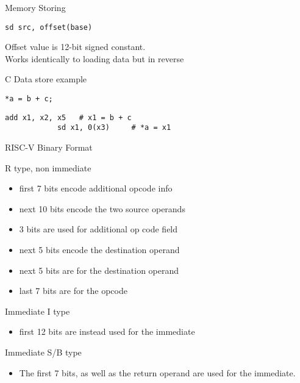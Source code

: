 \documentclass{report}
\begin{document}
\begin{description}
    \item {\large Memory Storing}
        \begin{lstlisting}[language = {[x86asm]Assembler}]
            sd src, offset(base)
        \end{lstlisting}

        Offset value is 12-bit signed constant.\\
        Works identically to loading data but in reverse
    \item {\large C Data store example}
        \begin{lstlisting}[langauge = C]
            *a = b + c;
        \end{lstlisting}
        

        \begin{lstlisting}[language = {[x86asm]Assembler}]
            add x1, x2, x5   # x1 = b + c
            sd x1, 0(x3)     # *a = x1
        \end{lstlisting}
    \item {\large RISC-V Binary Format}
        \begin{mdframed}
            \begin{description}
                \item R type, non immediate
                    \begin{itemize}
                        \item first 7 bits encode additional opcode info
                        \item next 10 bits encode the two source operands
                        \item 3 bits are used for additional op code field
                        \item next 5 bits encode the destination operand
                        \item next 5 bits are for the destination operand
                        \item last 7 bits are for the opcode
                    \end{itemize}
                \item Immediate I type
                    \begin{itemize}
                        \item first 12 bits are instead used for the immediate
                    \end{itemize}
                \item Immediate S/B type
                    \begin{itemize}
                        \item The first 7 bits, as well as the return operand are
                            used for the immediate.


\end{itemize}
\end{description}
\end{mdframed}
\end{description}
\end{document}
